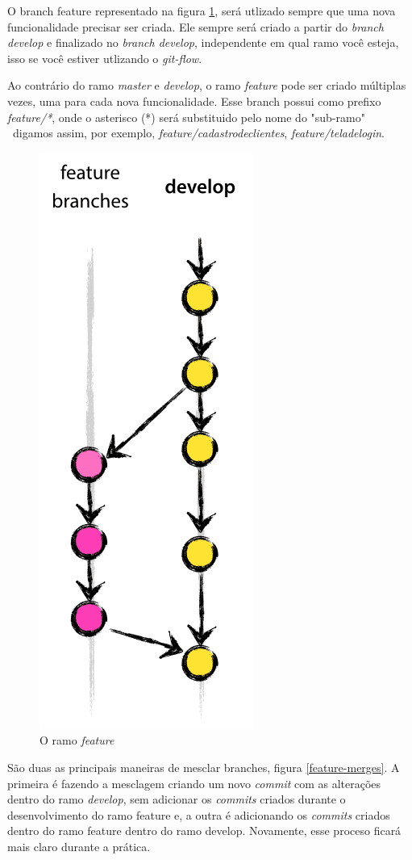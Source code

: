 \documentclass[12pt,openright,oneside,a4paper,english,brazil]{abntex2}
\begin{document}
O branch feature representado na figura \ref{feature}, será utlizado sempre que uma nova funcionalidade precisar ser criada. Ele sempre será criado a partir do\textit{ branch develop} e finalizado no \textit{branch develop}, independente em qual ramo você esteja, isso se você estiver utlizando o \textit{git-flow}.

Ao contrário do ramo \textit{master} e \textit{develop}, o ramo \textit{feature} pode ser criado múltiplas vezes, uma para cada nova funcionalidade. Esse branch possui como prefixo \textit{feature/*}, onde o asterisco (*) será substituido pelo nome do "sub-ramo" \ digamos assim, por exemplo, \textit{feature/cadastrodeclientes}, \textit{feature/teladelogin}.

\begin{figure}[H]
	\caption{\label{feature}O ramo \textit{feature}}
	\begin{center}
		\includegraphics[width=0.2\linewidth]{feature}
	\end{center}
\end{figure}


São duas as principais maneiras de mesclar branches, figura \ref{feature-merges}. A primeira é fazendo a mesclagem criando um novo \textit{commit} com as alterações dentro do ramo \textit{develop}, sem adicionar os \textit{commits} criados durante o desenvolvimento do ramo feature e, a outra é adicionando os \textit{commits} criados dentro do ramo feature dentro do ramo develop. Novamente, esse proceso ficará mais claro durante a prática.
\end{document}

